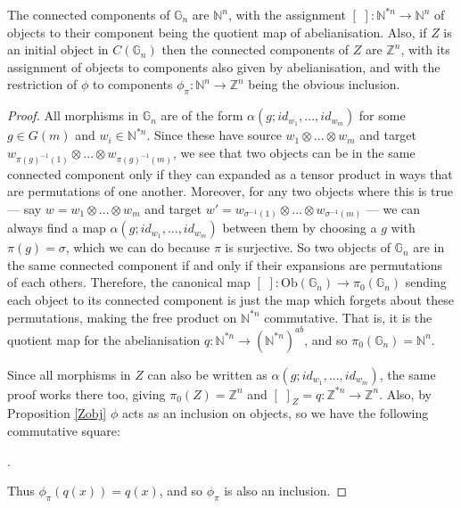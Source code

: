 \documentclass{amsart} %
\newenvironment{eq*}{\begin{equation*}}{\end{equation*}}
\begin{document}
\begin{prop}\label{concomp} The connected components of $\mathbb{G}_n$ are $\mathbb{N}^n$, with the assignment $[ \,\, ] : \mathbb{N}^{*n} \to \mathbb{N}^n$ of objects to their component being the quotient map of abelianisation. Also, if $Z$ is an initial object in $C(\mathbb{G}_n)$ then the connected components of $Z$ are $\mathbb{Z}^n$, with its assignment of objects to components also given by abelianisation, and with the restriction of $\phi$ to components $\phi_\pi : \mathbb{N}^n \to \mathbb{Z}^n$ being the obvious inclusion. 
\end{prop}
\begin{proof}All morphisms in $\mathbb{G}_n$ are of the form $\alpha(g; id_{w_1}, ..., id_{w_m})$ for some $g \in G(m)$ and $w_i \in \mathbb{N}^{*n}$. Since these have source $w_1 \otimes ... \otimes w_m$ and target $w_{\pi(g)^{-1}(1)} \otimes ... \otimes w_{\pi(g)^{-1}(m)}$, we see that two objects can be in the same connected component only if they can expanded as a tensor product in ways that are permutations of one another. Moreover, for any two objects where this is true --- say $w = w_1 \otimes ... \otimes w_m$ and target $w' = w_{\sigma^{-1}(1)} \otimes ... \otimes w_{\sigma^{-1}(m)}$ --- we can always find a map $\alpha(g; id_{w_1}, ..., id_{w_m})$  between them by choosing a $g$ with $\pi(g) = \sigma$, which we can do because $\pi$ is surjective. So two objects of $\mathbb{G}_n$ are in the same connected component if and only if their expansions are permutations of each others. Therefore, the canonical map $[ \,\, ] : \mathrm{Ob}(\mathbb{G}_n) \to \pi_0(\mathbb{G}_n)$ sending each object to its connected component is just the map which forgets about these permutations, making the free product on $\mathbb{N}^{*n}$ commutative. That is, it is the quotient map for the abelianisation $q : \mathbb{N}^{*n} \to (\mathbb{N}^{*n})^{ab}$, and so $\pi_0(\mathbb{G}_n) = \mathbb{N}^n$. 

Since all morphisms in $Z$ can also be written as $\alpha(g; id_{w_1}, ..., id_{w_m})$, the same proof works there too, giving $\pi_0(Z) = \mathbb{Z}^n$ and $[ \,\, ]_Z = q : \mathbb{Z}^{*n} \to \mathbb{Z}^n$. Also, by Proposition \ref{Zobj} $\phi$ acts as an inclusion on objects, so we have the following commutative square:
\begin{eq*} .
\end{eq*}
Thus $\phi_\pi(q(x)) = q(x)$, and so $\phi_\pi$ is also an inclusion.
\end{proof}
\end{document}
